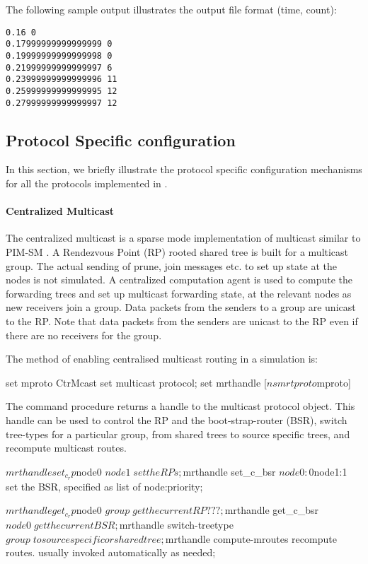 The following sample output illustrates the output file format (time, count):
{\small
\begin{verbatim}
0.16 0
0.17999999999999999 0
0.19999999999999998 0
0.21999999999999997 6
0.23999999999999996 11
0.25999999999999995 12
0.27999999999999997 12
\end{verbatim}
}

\subsection{Protocol Specific configuration}

In this section, we briefly illustrate the
protocol specific configuration mechanisms
for all the protocols implemented in \ns.

\paragraph{Centralized Multicast}
The centralized multicast is a sparse mode implementation of multicast
similar to PIM-SM \cite{Deer94a:Architecture}.
A Rendezvous Point (RP) rooted shared tree is built
for a multicast group.  The actual sending of prune, join messages
etc. to set up state at the nodes is not simulated.  A centralized
computation agent is used to compute the forwarding trees and set up
multicast forwarding state,  at the relevant nodes as new
receivers join a group.  Data packets from the senders to a group are
unicast to the RP.  Note that data packets from the senders are
unicast to the RP even if there are no receivers for the group.

The method of enabling centralised multicast routing in a simulation is:
\begin{program}
        set mproto CtrMcast    \; set multicast protocol;
        set mrthandle [$ns mrtproto $mproto] 
\end{program}
The command procedure 
returns a handle to the multicast protocol object.
This handle can be used to control the RP and the boot-strap-router (BSR),
switch tree-types for a particular group,
from shared trees to source specific trees, and
recompute multicast routes.
\begin{program}
        $mrthandle set_c_rp $node0 $node1          \; set the RPs;
        $mrthandle set_c_bsr $node0:0 $node1:1     \; set the BSR, specified as list of node:priority;

        $mrthandle get_c_rp $node0 $group          \; get the current RP ???;
        $mrthandle get_c_bsr $node0                \; get the current BSR;

        $mrthandle switch-treetype $group         \; to source specific or shared tree;

        $mrthandle compute-mroutes       \; recompute routes. usually invoked automatically as needed;
\end{program}

